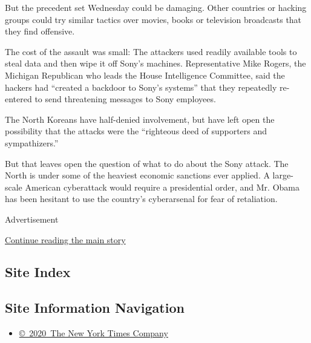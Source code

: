 But the precedent set Wednesday could be damaging. Other countries or
hacking groups could try similar tactics over movies, books or
television broadcasts that they find offensive.

The cost of the assault was small: The attackers used readily available
tools to steal data and then wipe it off Sony's machines. Representative
Mike Rogers, the Michigan Republican who leads the House Intelligence
Committee, said the hackers had ``created a backdoor to Sony's systems''
that they repeatedly re-entered to send threatening messages to Sony
employees.

The North Koreans have half-denied involvement, but have left open the
possibility that the attacks were the ``righteous deed of supporters and
sympathizers.''

But that leaves open the question of what to do about the Sony attack.
The North is under some of the heaviest economic sanctions ever applied.
A large-scale American cyberattack would require a presidential order,
and Mr. Obama has been hesitant to use the country's cyberarsenal for
fear of retaliation.

Advertisement

\protect\hyperlink{after-bottom}{Continue reading the main story}

\hypertarget{site-index}{%
\subsection{Site Index}\label{site-index}}

\hypertarget{site-information-navigation}{%
\subsection{Site Information
Navigation}\label{site-information-navigation}}

\begin{itemize}
\tightlist
\item
  \href{https://help.nytimes.com/hc/en-us/articles/115014792127-Copyright-notice}{©~2020~The
  New York Times Company}
\end{itemize}


